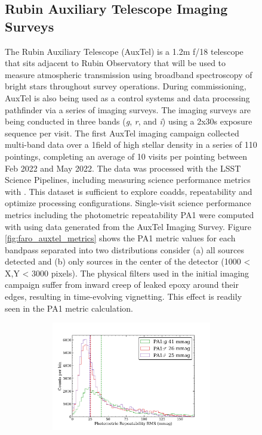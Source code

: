 \begin{figure}[!ht]
\subsection{Rubin Auxiliary Telescope Imaging Surveys} \label{ssec:auxtel}

The Rubin Auxiliary Telescope\cite{10.1117/12.2561112} (AuxTel) is a 1.2m f/18 telescope that sits adjacent to Rubin Observatory that will be used to measure atmospheric transmission using broadband spectroscopy of bright stars throughout survey operations. 
During commissioning, AuxTel is also being used as a control systems and data processing pathfinder via a series of imaging surveys. 
The imaging surveys are being conducted in three bands (\emph{g}, \emph{r}, and \emph{i}) using a 2x30s exposure sequence per visit.
The first AuxTel imaging campaign collected multi-band data over a 1\degsq field of high stellar density in a series of 110 pointings, completing an average of 10 visits per pointing between Feb 2022 and May 2022. 
The data was processed with the LSST Science Pipelines, including measuring science performance metrics with \faro. 
This dataset is sufficient to explore coadds, repeatability and optimize processing configurations.
Single-visit science performance metrics including the photometric repeatability PA1 were computed with \faro using data generated from the AuxTel Imaging Survey. 
Figure \ref{fig:faro_auxtel_metrics} shows the PA1 metric values for each bandpass separated into two distributions consider (a) all sources detected and (b) only sources in the center of the detector (1000 < X,Y < 3000 pixels). 
The physical filters used in the initial imaging campaign suffer from inward creep of leaked epoxy around their edges, resulting in time-evolving vignetting. 
This effect is readily seen in the PA1 metric calculation.  
\begin{figure}[!ht]
\begin{subfigure}{.5\textwidth}
    \centering
    \includegraphics[width=1.1\textwidth]{figures/pa1_auxtel}

\end{subfigure}
\end{figure}
\end{figure}
